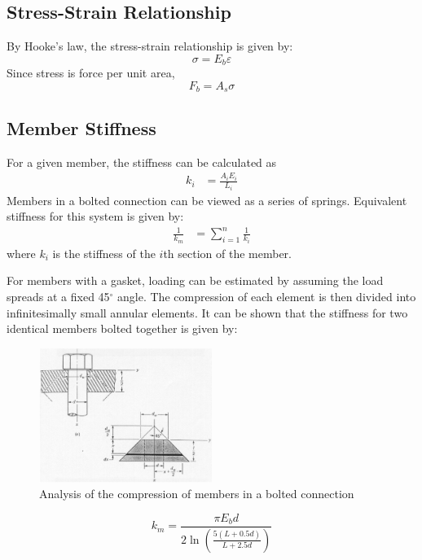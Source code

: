 \subsection{Stress-Strain Relationship}
By Hooke's law, the stress-strain relationship is given by:
\begin{equation}
    \sigma = E_b\varepsilon \label{eq:stress_strain}
\end{equation}
Since stress is force per unit area, 
\begin{equation}
    F_b = A_s\sigma \label{eq:force_area}
\end{equation}

\subsection{Member Stiffness}
For a given member, the stiffness can be calculated as 
\begin{align}
    k_i &= \frac{A_i E_i}{L_i} \label{eq:member_stiffness} 
\end{align}
Members in a bolted connection can be viewed as a series of springs. Equivalent stiffness for this system is given by:
\begin{align}
    \frac{1}{k_m} &= \sum_{i=1}^{n} \frac{1}{k_i} \label{eq:member_stiffness_series} 
\end{align}
where $k_i$ is the stiffness of the $i$th section of the member. 

For members with a gasket, loading can be estimated by assuming the load spreads at a fixed 45$^\circ$ angle. The compression of each element is then divided into infinitesimally small annular elements. It can be shown that the stiffness for two identical members bolted together is given by:
\begin{figure}[h]
    \centering
    \includegraphics[width=0.5\textwidth]{Sections/Figures/bolted connection gasket analysis.png}
    \caption{Analysis of the compression of members in a bolted connection}
    \label{fig:bolted_connection_gasket_analysis}
\end{figure}
\begin{equation}
    k_m = \frac{\pi E_b d}{2\ln\left(\frac{5(L+0.5d)}{L+2.5d}\right)} \label{eq:member_stiffness_theory}
\end{equation}

